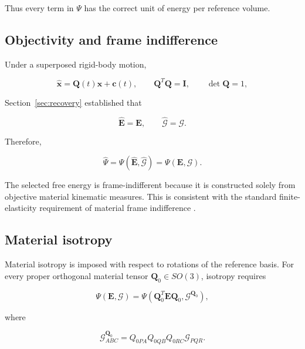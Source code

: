 \documentclass[11pt]{article}
\begin{document}
Thus every term in $\Psi$ has the correct unit of energy per reference volume.

\subsection{Objectivity and frame indifference}

Under a superposed rigid-body motion,

\begin{equation}
\widehat{\mathbf{x}}=\mathbf{Q}(t)\mathbf{x}+\mathbf{c}(t),
\qquad
\mathbf{Q}^{T}\mathbf{Q}=\mathbf{I},
\qquad
\det\mathbf{Q}=1,
\label{eq:sec2_superposed_motion}
\end{equation}

Section~\ref{sec:recovery} established that

\begin{equation}
\widehat{\mathbf{E}}=\mathbf{E},
\qquad
\widehat{\bm{\mathcal{G}}}=\bm{\mathcal{G}}.
\label{eq:sec2_E_G_objective}
\end{equation}

Therefore,

\begin{equation}
\widehat{\Psi}
=
\Psi(\widehat{\mathbf{E}},\widehat{\bm{\mathcal{G}}})
=
\Psi(\mathbf{E},\bm{\mathcal{G}}).
\label{eq:sec2_energy_objective}
\end{equation}

The selected free energy is frame-indifferent because it is constructed solely from objective material kinematic measures. This is consistent with the standard finite-elasticity requirement of material frame indifference \cite{Holzapfel2000,BonetWood2008,GurtinFriedAnand2010}.

\subsection{Material isotropy}

Material isotropy is imposed with respect to rotations of the reference basis. For every proper orthogonal material tensor $\mathbf{Q}_0\in SO(3)$, isotropy requires

\begin{equation}
\Psi(\mathbf{E},\bm{\mathcal{G}})
=
\Psi(\mathbf{Q}_0^{T}\mathbf{E}\mathbf{Q}_0,\bm{\mathcal{G}}^{\mathbf{Q}_0}),
\label{eq:sec2_material_isotropy}
\end{equation}

where

\begin{equation}
\mathcal{G}^{\mathbf{Q}_0}_{ABC}
=
Q_{0PA}Q_{0QB}Q_{0RC}\mathcal{G}_{PQR}.
\label{eq:sec2_G_material_rotation}
\end{equation}
\end{document}
